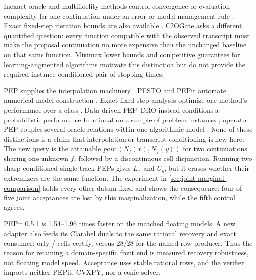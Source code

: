 \documentclass[smallextended]{svjour3}
\begin{document}
Inexact-oracle and multifidelity methods control convergence or evaluation
complexity for one continuation under an error or model-management rule
\citep{Carter1991,Devolder2014,Bellavia2019,Alexandrov1998,
ConnScheinbergVicente2009,Peherstorfer2018}.  Exact fixed-step iteration bounds
are also available \citep{Abbaszadehpeivasti2022}.  C2OGate asks a different
quantified question: every function compatible with the observed transcript
must make the proposal continuation no more expensive than the unchanged
baseline on that same function.  Minimax lower bounds
\citep{NemirovskyYudin1983,DroriTaylor2022} and competitive guarantees for
learning-augmented algorithms \citep{LykourisVassilvitskii2018,
MitzenmacherVassilvitskii2022} motivate this distinction but do not provide the
required instance-conditioned pair of stopping times.

PEP supplies the interpolation machinery
\citep{DroriTeboulle2014,TaylorPEP2017,TaylorInterpolation2017}.  PESTO and
PEPit automate numerical model construction \citep{TaylorPESTO2017,
GoujaudPEPit2024}.  Exact fixed-step analyses optimize one method's performance
over a class \citep{Abbaszadehpeivasti2022}.
Data-driven PEP--DRO instead conditions a probabilistic performance functional
on a sample of problem instances \citep{ParkRanjanStellato2025}; operator PEP
couples several oracle relations within one algorithmic model
\citep{RyuTaylorBergelingGiselsson2020}.  None of these distinctions is a claim
that interpolation or transcript conditioning is new here.  The new query is
the attainable \emph{pair} $(N_f(x),N_f(y))$ for two continuations sharing one
unknown $f$, followed by a discontinuous cell disjunction.  Running two sharp
conditioned single-track PEPs gives $L_x$ and $U_y$, but it erases whether their
extremizers are the same function.  The experiment in
\cref{sec:joint-marginal-comparison} holds every other datum fixed and shows the
consequence: four of five joint acceptances are lost by this marginalization,
while the fifth control agrees.

PEPit 0.5.1 is 1.54--1.96 times faster on the matched floating models.  A new
adapter also feeds its Clarabel duals to the same rational recovery and exact
consumer: only \PepitVerifiedCells{}/\PepitVerifiedAttempted{} cells certify,
versus 28/28 for the named-row producer.  Thus the reason for retaining a
domain-specific front end is measured recovery robustness, not floating model
speed.  Acceptance uses stable rational rows, and the verifier imports neither
PEPit, CVXPY, nor a conic solver.
\end{document}
